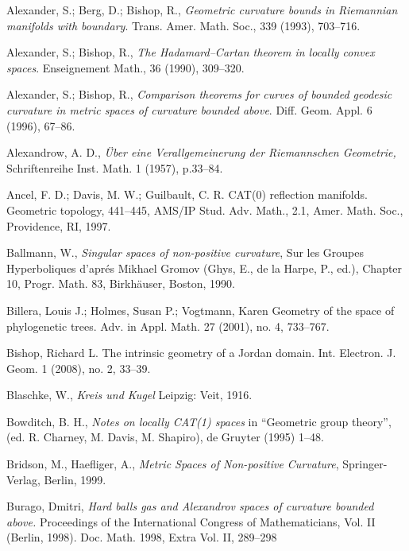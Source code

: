 \begin{thebibliography}{52}

 Alexander, S.; Berg, D.; Bishop, R., \textit{Geometric curvature bounds in Riemannian manifolds with
boundary}. Trans. Amer. Math. Soc., 339 (1993), 703--716.

Alexander, S.; Bishop, R., \textit{The Hadamard--Cartan theorem in locally convex spaces}. Enseignement Math., 36 (1990), 309--320.

 Alexander, S.; Bishop, R., 
\textit{Comparison theorems for curves of bounded geodesic curvature in metric spaces of curvature bounded above}.
Diff. Geom. Appl. 6 (1996), 67--86.

 Alexandrow, A. D.,  \textit{\"Uber eine Verallgemeinerung der Riemannschen Geometrie,}
Schriftenreihe Inst. Math. 1 (1957), p.33--84.

 Ancel, F. D.; Davis, M. W.; Guilbault, C. R.
CAT(0) reflection manifolds. Geometric topology, 441--445,
AMS/IP Stud. Adv. Math., 2.1, Amer. Math. Soc., Providence, RI, 1997.

Ballmann, W., \textit{Singular spaces of non-positive curvature}, Sur les Groupes Hyperboliques d'apr\'{e}s Mikhael Gromov (Ghys, E., de la Harpe, P., ed.), Chapter 10, Progr. Math. 83, Birkh\"auser, Boston, 1990. 

 Billera, Louis J.; Holmes, Susan P.; Vogtmann, Karen Geometry of the space of phylogenetic trees. Adv. in Appl. Math. 27 (2001), no. 4, 733--767.

Bishop, Richard L. The intrinsic geometry of a Jordan domain. Int. Electron. J. Geom. 1 (2008), no. 2, 33--39.

 Blaschke, W., \textit{Kreis und Kugel} Leipzig: Veit, 1916.

 Bowditch, B. H.,
\textit{Notes on locally CAT(1) spaces} 
in ``Geometric group theory'', (ed. R. Charney, M. Davis, M. Shapiro), de Gruyter (1995) 1--48.

Bridson, M., Haefliger, A.,
\textit{Metric Spaces of Non-positive Curvature},
Springer-Verlag, Berlin, 1999.

 Burago, Dmitri, \textit{Hard balls gas and Alexandrov spaces of curvature bounded above.} Proceedings of the International Congress of Mathematicians, Vol. II (Berlin, 1998). Doc. Math. 1998, Extra Vol. II, 289–298


\end{thebibliography}
